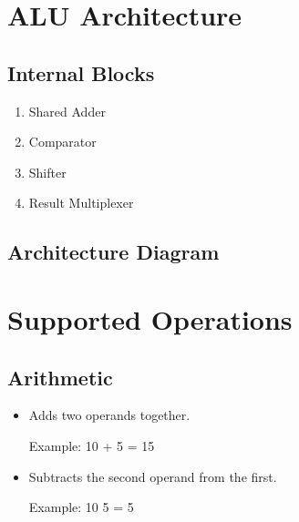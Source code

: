 \documentclass[letterpaper,10pt,english]{sphinxmanual}
\begin{document}
\sphinxstepscope


\chapter{ALU Architecture}
\label{\detokenize{alu_architecture:alu-architecture}}\label{\detokenize{alu_architecture::doc}}

\section{Internal Blocks}
\label{\detokenize{alu_architecture:internal-blocks}}\begin{enumerate}
%
\item {} 
\sphinxAtStartPar
Shared Adder

\item {} 
\sphinxAtStartPar
Comparator

\item {} 
\sphinxAtStartPar
Shifter

\item {} 
\sphinxAtStartPar
Result Multiplexer

\end{enumerate}


\section{Architecture Diagram}
\label{\detokenize{alu_architecture:architecture-diagram}}
\sphinxstepscope


\chapter{Supported Operations}
\label{\detokenize{alu_operations:supported-operations}}\label{\detokenize{alu_operations::doc}}

\section{Arithmetic}
\label{\detokenize{alu_operations:arithmetic}}\begin{itemize}
\item {} 
\sphinxAtStartPar
{} \sphinxhyphen{} Adds two operands together.

\sphinxAtStartPar
Example: 10 + 5 = 15

\item {} 
\sphinxAtStartPar
{} \sphinxhyphen{} Subtracts the second operand from the first.

\sphinxAtStartPar
Example: 10 \sphinxhyphen{} 5 = 5

\end{itemize}
\end{document}
